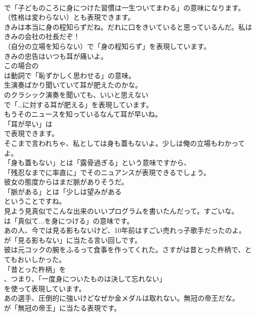 \documentclass[8pt]{extreport}
\begin{document}
\begin{CJK}{UTF8}{min}
\\	で「子どものころに身につけた習慣は一生ついてまわる」の意味になります。
\\	（性格は変わらない）とも表現できます。	
\\	きみは本当に身の程知らずだね。だれに口をきいていると思っているんだ。私はきみの会社の社長だぞ！ 
\\	（自分の立場を知らない）で「身の程知らず」を表現しています。	
\\	きみの忠告はいつも耳が痛いよ。 
\\	この場合の 
\\	は動詞で「恥ずかしく思わせる」の意味。	
\\	生演奏ばかり聞いていて耳が肥えたのかな。
\\	のクラシック演奏を聞いても、いいと思えない 
\\	で「…に対する耳が肥える」を表現しています。	
\\	もうそのニュースを知っているなんて耳が早いね。 
\\	「耳が早い」は 
\\	で表現できます。	
\\	そこまで言われちゃ、私としては身も蓋もないよ。少しは俺の立場もわかってよ。 
\\	「身も蓋もない」とは「露骨過ぎる」という意味ですから、
\\	「残忍なまでに率直に」でそのニュアンスが表現できるでしょう。	
\\	彼女の態度からはまだ脈がありそうだ。 
\\	「脈がある」とは「少しは望みがある
\\	ということですね。	
\\	見よう見真似でこんな出来のいいプログラムを書いたんだって。すごいな。 
\\	は「真似て...を身につける」の意味です。	
\\	あの人、今では見る影もないけど、10年前はすごい売れっ子歌手だったのよ。 
\\	が「見る影もない」に当たる言い回しです。	
\\	彼は元コックの腕をふるって食事を作ってくれた。さすがは昔とった杵柄で、とてもおいしかった。 
\\	「昔とった杵柄」を
\\	、つまり、「一度身についたものは決して忘れない」
\\	を使って表現しています。	
\\	あの選手、圧倒的に強いけどなぜか金メダルは取れない。無冠の帝王だな。 
\\	が「無冠の帝王」に当たる表現です。	

\end{CJK}
\end{document}

